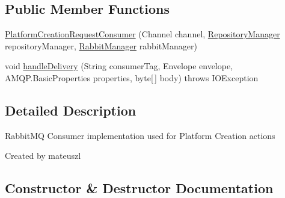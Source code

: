 \subsection*{Public Member Functions}
\begin{DoxyCompactItemize}
\item 
\hyperlink{classeu_1_1h2020_1_1symbiote_1_1messaging_1_1PlatformCreationRequestConsumer_ac7f4497c390c067a2e42196b0e050bf9}{Platform\+Creation\+Request\+Consumer} (Channel channel, \hyperlink{classeu_1_1h2020_1_1symbiote_1_1repository_1_1RepositoryManager}{Repository\+Manager} repository\+Manager, \hyperlink{classeu_1_1h2020_1_1symbiote_1_1messaging_1_1RabbitManager}{Rabbit\+Manager} rabbit\+Manager)
\item 
void \hyperlink{classeu_1_1h2020_1_1symbiote_1_1messaging_1_1PlatformCreationRequestConsumer_a5effadb30758abb5f438be74a6c7f054}{handle\+Delivery} (String consumer\+Tag, Envelope envelope, A\+M\+Q\+P.\+Basic\+Properties properties, byte\mbox{[}$\,$\mbox{]} body)  throws I\+O\+Exception 
\end{DoxyCompactItemize}


\subsection{Detailed Description}
Rabbit\+MQ Consumer implementation used for Platform Creation actions

Created by mateuszl 

\subsection{Constructor \& Destructor Documentation}
